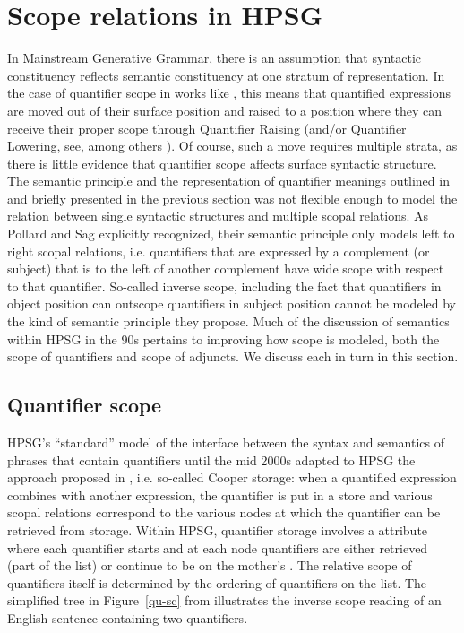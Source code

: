\documentclass[output=paper]{langsci/langscibook}
\begin{document}
\section{Scope relations in HPSG}

In Mainstream Generative Grammar, there is an assumption that syntactic constituency reflects semantic constituency at one stratum of representation. In the case of quantifier scope in works like \citet{May1985}, this means that quantified expressions are moved out of their surface position and raised to a position where they can receive their proper scope through Quantifier Raising (and/or Quantifier Lowering, see, among others \citealt{Hornstein1995}). Of course, such a move requires multiple strata, as there is little evidence that quantifier scope affects surface syntactic structure. The semantic principle and the representation of quantifier meanings outlined in \citet{PollardandSag1987} and briefly presented in the previous section was not flexible enough to model the relation between single syntactic structures and multiple scopal relations. As Pollard and Sag explicitly recognized, their semantic principle only models left to right scopal relations, i.e. quantifiers that are expressed by a complement (or subject) that is to the left of another complement have wide scope with respect to that quantifier. So-called inverse scope, including the fact that quantifiers in object position can outscope quantifiers in subject position cannot be modeled by the kind of semantic principle they propose. Much of the discussion of semantics within HPSG in the 90s pertains to improving how scope is modeled, both the scope of quantifiers and scope of adjuncts. We discuss each in turn in this section.


\subsection{Quantifier scope}

HPSG's ``standard'' model of the interface between the syntax and semantics of phrases that contain quantifiers until the mid 2000s adapted to HPSG the approach proposed in \citet{Cooper1975,Cooper1983}, i.e. so-called Cooper storage: when a quantified expression combines with another expression, the quantifier is put in a store and various scopal relations correspond to the various nodes at which the quantifier can be retrieved from storage. Within HPSG, quantifier storage involves a  attribute where each quantifier starts and at each node quantifiers are either retrieved (part of the  list) or continue to be on the mother's . The relative scope of quantifiers itself is determined by the ordering of quantifiers on the  list. The simplified tree in Figure~\ref{qu-sc} from \citet[324]{PollardandSag1994} illustrates the inverse scope reading of an English sentence containing two quantifiers.
\end{document}
